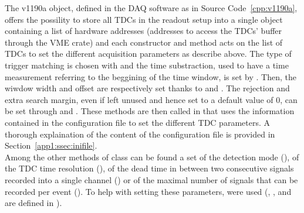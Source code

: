 	The v1190a object, defined in the DAQ software as in Source Code~\ref{cpp:v1190a}, offers the possility to store all TDCs in the readout setup into a single object containing a list of hardware addresses (addresses to access the TDCs' buffer through the VME crate) and each constructor and method acts on the list of TDCs to set the different acquisition parameters as describe above. The type of trigger matching is chosen with  and the time substraction, used to have a time measurement referring to the beggining of the time window, is set by . Then, the wiwdow width and offset are respectively set thanks to  and . The rejection and extra search margin, even if left unused and hence set to a default value of 0, can be set through  and . These methods are then called in  that uses the information contained in the configuration file  to set the different TDC parameters. A thorough explaination of the content of the configuration file is provided in Section~\ref{app1:ssec:inifile}.\\
	
	Among the other methods of class  can be found a set of the detection mode (), of the TDC time resolution (), of the dead time in between two consecutive signals recorded into a single channel () or of the maximal number of signals that can be recorded per event (). To help with setting these parameters,  were used (, ,  and  are defined in ).\\
	
